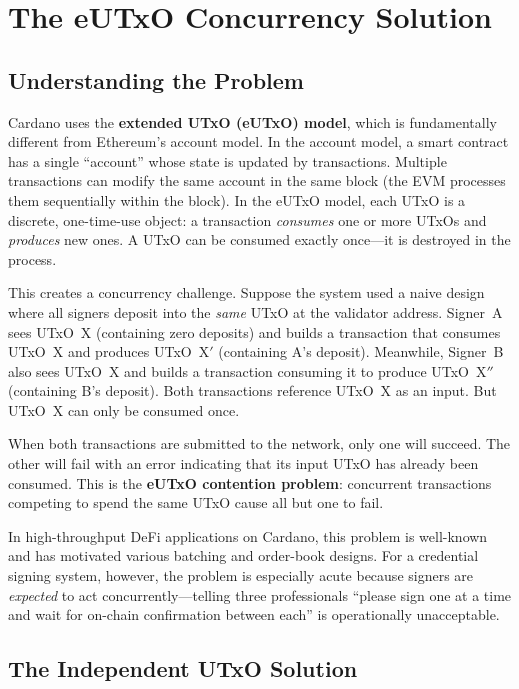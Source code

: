 \section{The eUTxO Concurrency Solution}
\label{sec:eutxo-concurrency}

\subsection{Understanding the Problem}

Cardano uses the \textbf{extended UTxO (eUTxO) model}, which is
fundamentally different from Ethereum's account model.  In the account model,
a smart contract has a single ``account'' whose state is updated by
transactions.  Multiple transactions can modify the same account in the same
block (the EVM processes them sequentially within the block).  In the eUTxO
model, each UTxO is a discrete, one-time-use object: a transaction
\emph{consumes} one or more UTxOs and \emph{produces} new ones.  A UTxO can
be consumed exactly once---it is destroyed in the process.

This creates a concurrency challenge.  Suppose the system used a naive design
where all signers deposit into the \emph{same} UTxO at the validator address.
Signer~A sees UTxO~X (containing zero deposits) and builds a transaction that
consumes UTxO~X and produces UTxO~X$'$ (containing A's deposit).  Meanwhile,
Signer~B also sees UTxO~X and builds a transaction consuming it to produce
UTxO~X$''$ (containing B's deposit).  Both transactions reference UTxO~X as
an input.  But UTxO~X can only be consumed once.

When both transactions are submitted to the network, only one will succeed.
The other will fail with an error indicating that its input UTxO has already
been consumed.  This is the \textbf{eUTxO contention problem}: concurrent
transactions competing to spend the same UTxO cause all but one to fail.

In high-throughput DeFi applications on Cardano, this problem is well-known
and has motivated various batching and order-book designs.  For a credential
signing system, however, the problem is especially acute because signers are
\emph{expected} to act concurrently---telling three professionals ``please
sign one at a time and wait for on-chain confirmation between each'' is
operationally unacceptable.

\subsection{The Independent UTxO Solution}

